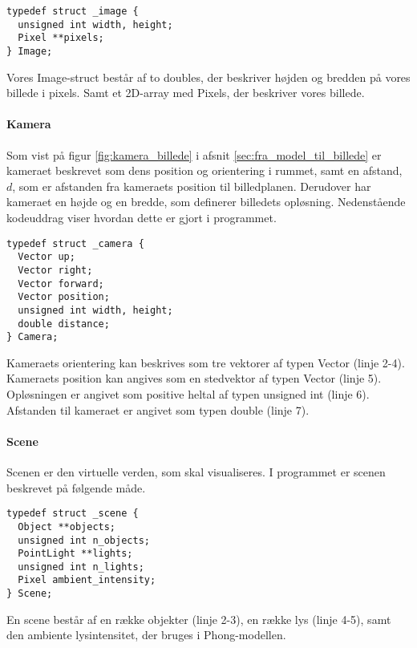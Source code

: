 \begin{lstlisting}[style=Cstyle, caption=Struct til Image]
typedef struct _image {
  unsigned int width, height;
  Pixel **pixels;
} Image;
\end{lstlisting}

Vores Image-struct består af to doubles, der beskriver højden og bredden på vores billede i pixels. Samt et 2D-array med Pixels, der beskriver vores billede.

\paragraph{Kamera}
Som vist på figur \ref{fig:kamera_billede} i afsnit \ref{sec:fra_model_til_billede} er kameraet beskrevet som dens position og orientering i rummet, samt en afstand, $d$, som er afstanden fra kameraets position til billedplanen. Derudover har kameraet en højde og en bredde, som definerer billedets opløsning. Nedenstående kodeuddrag viser hvordan dette er gjort i programmet.

\begin{lstlisting}[style=Cstyle, caption=Struct til kamera]
typedef struct _camera {
  Vector up;
  Vector right;
  Vector forward;
  Vector position;
  unsigned int width, height;
  double distance;
} Camera;
\end{lstlisting}

Kameraets orientering kan beskrives som tre vektorer af typen Vector (linje 2-4). Kameraets position kan angives som en stedvektor af typen Vector (linje 5). Opløsningen er angivet som positive heltal af typen unsigned int (linje 6). Afstanden til kameraet er angivet som typen double (linje 7).

\paragraph{Scene}
Scenen er den virtuelle verden, som skal visualiseres. I programmet er scenen beskrevet på følgende måde. 

\begin{lstlisting}[style=Cstyle, caption=Struct til scene]
typedef struct _scene {
  Object **objects;
  unsigned int n_objects;
  PointLight **lights;
  unsigned int n_lights;
  Pixel ambient_intensity;
} Scene;
\end{lstlisting}

En scene består af en række objekter (linje 2-3), en række lys (linje 4-5), samt den ambiente lysintensitet, der bruges i Phong-modellen.

